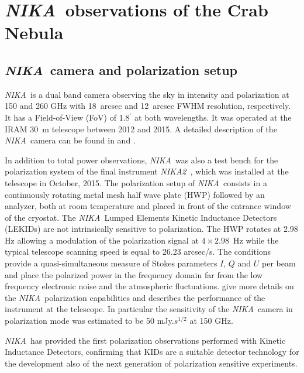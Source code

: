 \documentclass[twocolumn,traditabstract]{aa}
\def\NIKA{\textit{NIKA}}
\def\NIKAd{\textit{NIKA2}}
\begin{document}
\section{\NIKA\ observations of the Crab Nebula}\label{sec:NIKA observations}
\subsection{\NIKA\ camera and polarization setup}\label{sec:nika camera}
\NIKA\ is a dual band camera observing the sky in intensity and polarization at
150 and 260 GHz with 18~arcsec and 12~arcsec FWHM resolution, respectively. It
has a Field-of-View (FoV) of 1.8$^{\prime}$ at both wavelengths. It was operated at the
IRAM 30~m telescope between 2012 and 2015. A detailed description of the
\NIKA\ camera can be found in \citet{monfardini2010, monfardini2011} and
\citet{catalano2014}.

In addition to total power observations, \NIKA\ was also a test
bench for the polarization system of the final instrument
\NIKAd\ \citep{calvo2016,catalano2016nika2,2017arXiv170700908A}, which was installed at the
telescope in October, 2015. The polarization setup of \NIKA\
consists in a continuously rotating metal mesh half wave plate (HWP)
followed by an analyzer, both at room temperature and placed in
front of the entrance window of the cryostat. The \NIKA\ Lumped Elements Kinetic
Inductance Detectors (LEKIDs) are not intrinsically sensitive to
polarization. The HWP rotates at 2.98 Hz allowing a modulation of the polarization signal at $4\times 2.98$~Hz while the typical telescope scanning speed is equal to 26.23 arcsec/s.
The conditions provide a quasi-simultaneous measure of Stokes parameters $I$, $Q$ and $U$
per beam and place the polarized power in the frequency domain far from the low frequency
electronic noise and the atmospheric fluctuations. \cite{ritacco2017} give more
details on the \NIKA\ polarization capabilities and describes the performance of
the instrument at the telescope. In particular the sensitivity of the
\NIKA\ camera in polarization mode was estimated to be 50 mJy.$s^{1/2}$ at 150
GHz.

\NIKA\ has provided the first polarization
observations performed with Kinetic Inductance Detectors, confirming that KIDs are a
suitable detector technology for the development also of the next generation of polarization sensitive
experiments.
\end{document}
